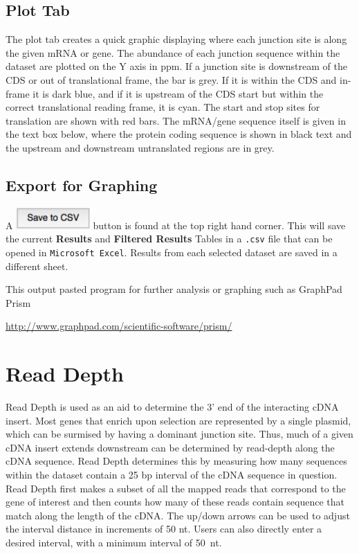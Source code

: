 \documentclass[11pt,fleqn]{book} %
\newcommand{\ReadDepth}{{\color{Bittersweet} Read Depth }}
\begin{document}
\section{Plot Tab}

The plot tab creates a quick graphic displaying where each junction site is along the given mRNA or gene.  The abundance of each junction sequence within the dataset are plotted on the Y axis in ppm. If a junction site is downstream of the CDS or out of translational frame, the bar is grey.  If it is within the CDS and in-frame it is dark blue, and if it is upstream of the CDS start but within the correct translational reading frame, it is cyan.  The start and stop sites for translation are shown with red bars. The mRNA/gene sequence itself is given in the text box below, where the protein coding sequence is shown in black text and the upstream and downstream untranslated regions are in grey.

\section{Export for Graphing}

A \includegraphics[width=80pt]{Pictures/save_csv_btn} button is found at the top right hand corner.
This will save the current \textbf{Results} and \textbf{Filtered Results} Tables in a \texttt{.csv} file that can be opened in \texttt{Microsoft Excel}. Results from each selected dataset are saved in a different sheet.

This output pasted program for further analysis or graphing such as GraphPad Prism

\vspace{10pt}
\href{http://www.graphpad.com/scientific-software/prism/}{http://www.graphpad.com/scientific-software/prism/}

\chapter{\ReadDepth}

\ReadDepth is used as an aid to determine the 3’ end of the interacting cDNA insert.  Most genes that enrich upon selection are represented by a single plasmid, which can be surmised by having a dominant junction site.  Thus, much of a given cDNA insert extends downstream can be determined by read-depth along the cDNA sequence. \ReadDepth determines this by measuring how many sequences within the dataset contain a 25 bp interval of the cDNA sequence in question. \ReadDepth first makes a subset of all the mapped reads that correspond to the gene of interest and then counts how many of these reads contain sequence that match along the length of the cDNA. 
The up/down arrows can be used to adjust the interval distance in increments of 50 nt.  Users can also directly enter a desired interval, with a minimum interval of 50~nt.
\end{document}
